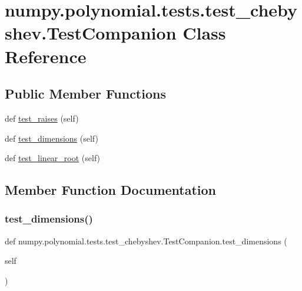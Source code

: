 \hypertarget{classnumpy_1_1polynomial_1_1tests_1_1test__chebyshev_1_1TestCompanion}{}\section{numpy.\+polynomial.\+tests.\+test\+\_\+chebyshev.\+Test\+Companion Class Reference}
\label{classnumpy_1_1polynomial_1_1tests_1_1test__chebyshev_1_1TestCompanion}
\subsection*{Public Member Functions}
\begin{DoxyCompactItemize}
\item 
def \hyperlink{classnumpy_1_1polynomial_1_1tests_1_1test__chebyshev_1_1TestCompanion_a11fc0f8b108294768da93b7f53f2673d}{test\+\_\+raises} (self)
\item 
def \hyperlink{classnumpy_1_1polynomial_1_1tests_1_1test__chebyshev_1_1TestCompanion_a6b3f9f54b5eb38dcfd654fe81416a31c}{test\+\_\+dimensions} (self)
\item 
def \hyperlink{classnumpy_1_1polynomial_1_1tests_1_1test__chebyshev_1_1TestCompanion_ae8a130e6025cc90fe087115df085fed2}{test\+\_\+linear\+\_\+root} (self)
\end{DoxyCompactItemize}


\subsection{Member Function Documentation}
\mbox{\label{classnumpy_1_1polynomial_1_1tests_1_1test__chebyshev_1_1TestCompanion_a6b3f9f54b5eb38dcfd654fe81416a31c}} 
\subsubsection{\texorpdfstring{test\+\_\+dimensions()}{test\_dimensions()}}
{\footnotesize\ttfamily def numpy.\+polynomial.\+tests.\+test\+\_\+chebyshev.\+Test\+Companion.\+test\+\_\+dimensions (\begin{DoxyParamCaption}\item[{}]{self }\end{DoxyParamCaption})}

